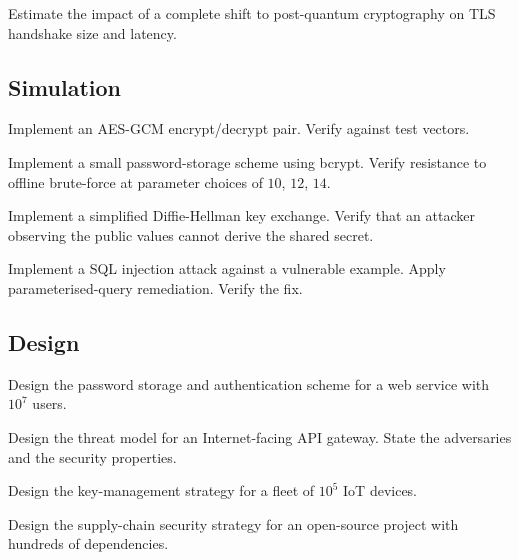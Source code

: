 \begin{exercise}
Estimate the impact of a complete shift to post-quantum cryptography on TLS handshake size and latency.
\end{exercise}

\subsection*{Simulation}

\begin{exercise}
Implement an AES-GCM encrypt/decrypt pair. Verify against test vectors.
\end{exercise}

\begin{exercise}
Implement a small password-storage scheme using bcrypt. Verify resistance to offline brute-force at parameter choices of $10$, $12$, $14$.
\end{exercise}

\begin{exercise}
Implement a simplified Diffie-Hellman key exchange. Verify that an attacker observing the public values cannot derive the shared secret.
\end{exercise}

\begin{exercise}
Implement a SQL injection attack against a vulnerable example. Apply parameterised-query remediation. Verify the fix.
\end{exercise}

\subsection*{Design}

\begin{exercise}
Design the password storage and authentication scheme for a web service with $10^7$ users.
\end{exercise}

\begin{exercise}
Design the threat model for an Internet-facing API gateway. State the adversaries and the security properties.
\end{exercise}

\begin{exercise}
Design the key-management strategy for a fleet of $10^5$ IoT devices.
\end{exercise}

\begin{exercise}
Design the supply-chain security strategy for an open-source project with hundreds of dependencies.
\end{exercise}

